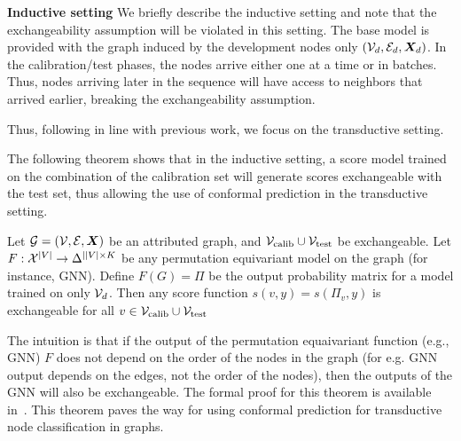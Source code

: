 \noindent \textbf{Inductive setting}
We briefly describe the inductive setting and note that the exchangeability assumption will be violated in this setting.
The base model is provided with the graph induced by the development nodes only $({\mathcal{V}}_d, {\mathcal{E}}_d, {\bm{X}}_d)$.
In the calibration/test phases, the nodes arrive either one at a time or in batches.
Thus, nodes arriving later in the sequence will have access to neighbors that arrived earlier, breaking the exchangeability assumption.

Thus, following in line with previous work, we focus on the transductive setting.

The following theorem shows that in the inductive setting, a score model trained on the combination of the calibration set will generate scores exchangeable with the test set, thus allowing the use of conformal prediction in the transductive setting.

\begin{theorem}
    Let ${\mathcal{G}} = ({\mathcal{V}}, {\mathcal{E}}, {\bm{X}})$ be an attributed graph, and ${\mathcal{V}}_{\text{calib}} \cup {\mathcal{V}}_{\text{test}}$ be exchangeable.
    Let $F: {\mathcal{X}}^{|V|} \rightarrow \Delta^{||V| \times K}$ be any permutation equivariant model on the graph (for instance, GNN). 
    Define $F(G) = \Pi$ be the output probability matrix for a model trained on only ${\mathcal{V}}_d$.
    Then any score function $s(v, y) = s(\Pi_v, y)$ is exchangeable for all $v \in {\mathcal{V}}_{\text{calib}} \cup{\mathcal{V}}_{\text{test}} $
    \label{thm:exchangeability}
\end{theorem}
The intuition is that if the output of the permutation equaivariant function (e.g., GNN) $F$ does not depend on the order of the nodes in the graph (for e.g. GNN output depends on the edges, not the order of the nodes), then the outputs of the GNN will also be exchangeable.
The formal proof for this theorem is available in~\citet{zargarbashi23conformal,huang2024uncertainty}.
This theorem paves the way for using conformal prediction for transductive node classification in graphs.


